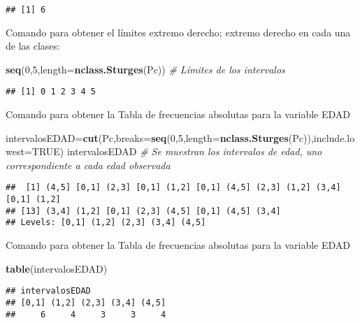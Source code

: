 \documentclass[
]{book}
\newenvironment{Shaded}{\begin{snugshade}}{\end{snugshade}}
\newcommand{\CommentTok}[1]{\textcolor[rgb]{0.56,0.35,0.01}{\textit{#1}}}
\newcommand{\DataTypeTok}[1]{\textcolor[rgb]{0.13,0.29,0.53}{#1}}
\newcommand{\DecValTok}[1]{\textcolor[rgb]{0.00,0.00,0.81}{#1}}
\newcommand{\KeywordTok}[1]{\textcolor[rgb]{0.13,0.29,0.53}{\textbf{#1}}}
\newcommand{\NormalTok}[1]{#1}
\newcommand{\OtherTok}[1]{\textcolor[rgb]{0.56,0.35,0.01}{#1}}
\theoremstyle{definition}
\theoremstyle{definition}
\theoremstyle{definition}
\theoremstyle{definition}
\theoremstyle{remark}
\begin{document}
\begin{verbatim}
## [1] 6
\end{verbatim}

Comando para obtener el límites extremo derecho; extremo derecho en cada una de las clases:

\begin{Shaded}
\begin{Highlighting}[]
\KeywordTok{seq}\NormalTok{(}\DecValTok{0}\NormalTok{,}\DecValTok{5}\NormalTok{,}\DataTypeTok{length=}\KeywordTok{nclass.Sturges}\NormalTok{(Pc))  }\CommentTok{# Límites de los intervalos}
\end{Highlighting}
\end{Shaded}

\begin{verbatim}
## [1] 0 1 2 3 4 5
\end{verbatim}

Comando para obtener la Tabla de frecuencias absolutas para la variable EDAD

\begin{Shaded}
\begin{Highlighting}[]
\NormalTok{intervalosEDAD=}\KeywordTok{cut}\NormalTok{(Pc,}\DataTypeTok{breaks=}\KeywordTok{seq}\NormalTok{(}\DecValTok{0}\NormalTok{,}\DecValTok{5}\NormalTok{,}\DataTypeTok{length=}\KeywordTok{nclass.Sturges}\NormalTok{(Pc)),}\DataTypeTok{include.lowest=}\OtherTok{TRUE}\NormalTok{)}
\NormalTok{intervalosEDAD }\CommentTok{# Se muestran los intervalos de edad, uno correspondiente a cada edad observada}
\end{Highlighting}
\end{Shaded}

\begin{verbatim}
##  [1] (4,5] [0,1] (2,3] [0,1] (1,2] [0,1] (4,5] (2,3] (1,2] (3,4] [0,1] (1,2]
## [13] (3,4] (1,2] [0,1] (2,3] (4,5] [0,1] (4,5] (3,4]
## Levels: [0,1] (1,2] (2,3] (3,4] (4,5]
\end{verbatim}

Comando para obtener la Tabla de frecuencias absolutas para la variable EDAD

\begin{Shaded}
\begin{Highlighting}[]
\KeywordTok{table}\NormalTok{(intervalosEDAD)}
\end{Highlighting}
\end{Shaded}

\begin{verbatim}
## intervalosEDAD
## [0,1] (1,2] (2,3] (3,4] (4,5] 
##     6     4     3     3     4
\end{verbatim}
\end{document}
